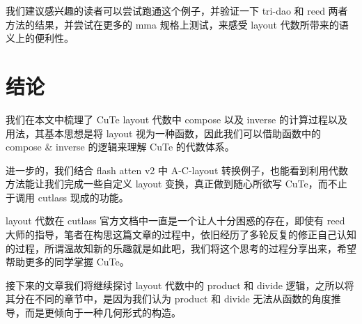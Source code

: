我们建议感兴趣的读者可以尝试跑通这个例子，并验证一下 tri-dao 和 reed 两者方法的结果，并尝试在更多的 mma 规格上测试，来感受 layout 代数所带来的语义上的便利性。

\section{结论}

我们在本文中梳理了 CuTe layout 代数中 compose 以及 inverse 的计算过程以及用法，其基本思想是将 layout 视为一种函数，因此我们可以借助函数中的 compose \& inverse 的逻辑来理解 CuTe 的代数体系。

进一步的，我们结合 flash atten v2 中 A-C-layout 转换例子，也能看到利用代数方法能让我们完成一些自定义 layout 变换，真正做到随心所欲写 CuTe，而不止于调用 cutlass 现成的功能。

layout 代数在 cutlass 官方文档中一直是一个让人十分困惑的存在，即使有 reed 大师的指导，笔者在构思这篇文章的过程中，依旧经历了多轮反复的修正自己认知的过程，所谓温故知新的乐趣就是如此吧，我们将这个思考的过程分享出来，希望帮助更多的同学掌握 CuTe。

接下来的文章我们将继续探讨 layout 代数中的 product 和 divide 逻辑，之所以将其分在不同的章节中，是因为我们认为 product 和 divide 无法从函数的角度推导，而是更倾向于一种几何形式的构造。
